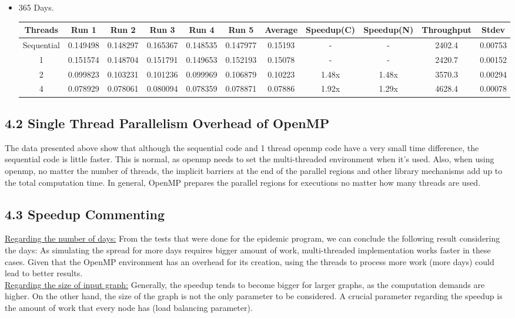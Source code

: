 \documentclass{article}
\begin{document}
\begin{itemize}
    \item 365 Days.
    \begin{center}
    \begin{adjustbox}{width=\columnwidth,center}
    \begin{tabular}{||c | c c c c c | c | c c | c c ||} 
    \hline
    Threads & Run 1 & Run 2 & Run 3 & Run 4 & Run 5 & Average & Speedup(C) & Speedup(N) & Throughput & Stdev \\ [0.5ex] 
    \hline\hline
    Sequential & 0.149498 & 0.148297 & 0.165367 & 0.148535 & 0.147977 & 0.15193 & - & - & 2402.4  & 0.00753\\ 
    \hline
    1 & 0.151574 & 0.148704 & 0.151791 & 0.149653 & 0.152193 & 0.15078 & - & - & 2420.7 & 0.00152\\ 
    \hline
    2 & 0.099823 & 0.103231 & 0.101236 & 0.099969 & 0.106879 & 0.10223 & 1.48x & 1.48x &  3570.3 & 0.00294\\ 
    \hline
    4 & 0.078929 & 0.078061 & 0.080094 & 0.078359 & 0.078871 & 0.07886 & 1.92x & 1.29x & 4628.4 & 0.00078\\ 
    \hline
    \end{tabular}
    \end{adjustbox}
    \end{center}
\end{itemize}    

\subsection*{4.2 Single Thread Parallelism Overhead of OpenMP}
The data presented above show that although the sequential code and 1 thread openmp code have a very small time difference, the sequential code is little faster. This is normal, as openmp needs to set the multi-threaded environment when it's used. Also, when using openmp, no matter the number of threads, the implicit barriers at the end of the parallel regions and other library mechanisms add up to the total computation time. In general, OpenMP prepares the parallel regions for executions no matter how many threads are used.

\subsection*{4.3 Speedup Commenting}
\underline{Regarding the number of days:} From the tests that were done for the epidemic program, we can conclude the following result considering the days: As simulating the spread for more days requires bigger amount of work, multi-threaded implementation works faster in these cases. Given that the OpenMP environment has an overhead for its creation, using the threads to process more work (more days) could lead to better results.\\
\underline{Regarding the size of input graph:} Generally, the speedup tends to become bigger for larger graphs, as the computation demands are higher. On the other hand, the size of the graph is not the only parameter to be considered. A crucial parameter regarding the speedup is the amount of work that every node has (load balancing parameter).
\end{document}
